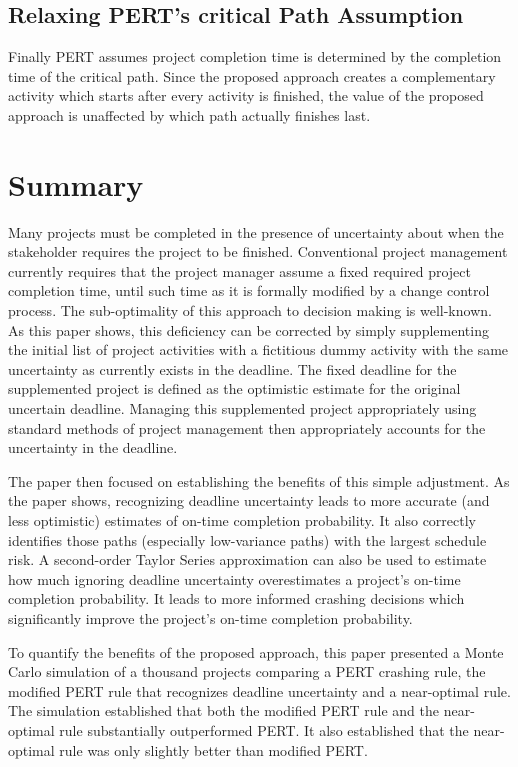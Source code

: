 \documentclass[11pt]{article}
\begin{document}
\subsection{Relaxing PERT's critical Path Assumption}
Finally PERT assumes project completion time is determined by the completion time of the critical path.  Since the proposed approach creates a complementary activity which starts after every activity is finished, the value of the proposed approach is unaffected by which path actually finishes last. \par

\section{Summary}
Many projects must be completed in the presence of uncertainty about when the stakeholder requires the project to be finished.    Conventional project management currently requires that the project manager assume a fixed required project completion time, until such time as it is formally modified by a change control process.   The sub-optimality of this approach to decision making is well-known.  As this paper shows, this deficiency can be corrected by simply supplementing the initial list of project activities with a fictitious dummy activity with the same uncertainty as currently exists in the deadline. The fixed deadline for the supplemented project is defined as the optimistic estimate for the original uncertain deadline.  Managing this supplemented project appropriately using standard methods of project management then appropriately accounts for the uncertainty in the deadline.\par
The paper then focused on establishing the benefits of this simple adjustment.  As the paper shows,  recognizing deadline uncertainty leads to more accurate (and less optimistic) estimates of on-time completion probability.  It also correctly identifies those paths (especially low-variance paths) with the largest schedule risk.  A second-order Taylor Series approximation can also be used to estimate how much ignoring deadline uncertainty overestimates a project's on-time completion probability. It leads to more informed crashing decisions which significantly improve the project's on-time completion probability.
\par
To quantify the benefits of the proposed approach, this paper presented a Monte Carlo simulation of a thousand projects comparing a PERT crashing rule, the modified PERT rule that recognizes deadline uncertainty and a near-optimal rule.   The simulation established that both the modified PERT rule and the near-optimal rule substantially outperformed PERT.  It also established that the near-optimal rule was only slightly better than modified PERT.  \par
\end{document}
